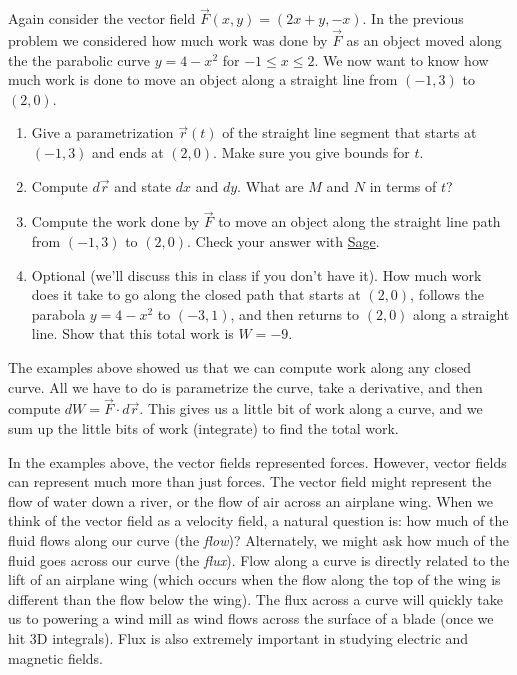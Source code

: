 \begin{problem}
 Again consider the vector field $\vec F(x,y) = (2x+y,-x)$. In the previous problem we considered how much work was done by $\vec F$ as an object moved along the the parabolic curve $y=4-x^2$ for $-1\leq x\leq 2$. We now want to know how much work is done to move an object along a straight line from $(-1,3)$ to $(2,0)$.    
\begin{enumerate}
 \item Give a parametrization $\vec r(t)$ of the straight line segment that starts at $(-1,3)$ and ends at $(2,0)$.  Make sure you give bounds for $t$. 
 \item Compute $d\vec r$ and state $dx$ and $dy$. What are $M$ and $N$ in terms of $t$?
 \item Compute the work done by $\vec F$ to move an object along the straight line path from $(-1,3)$ to $(2,0)$. Check your answer with \href{\sageworkurl}{Sage}. 
 \item Optional (we'll discuss this in class if you don't have it).  How much work does it take to go along the closed path that starts at $(2,0)$, follows the parabola $y=4-x^2$ to $(-3,1)$, and then returns to $(2,0)$ along a straight line. Show that this total work is $W=-9$.   
\end{enumerate}
\end{problem}


The examples above showed us that we can compute work along any closed curve.  All we have to do is parametrize the curve, take a derivative, and then compute $dW = \vec F \cdot d\vec r$. This gives us a little bit of work along a curve, and we sum up the little bits of work (integrate) to find the total work. 

In the examples above, the vector fields represented forces. However, vector fields can represent much more than just forces. The vector field might represent the flow of water down a river, or the flow of air across an airplane wing.  When we think of the vector field as a velocity field, a natural question is: how much of the fluid flows along our curve (the \emph{flow})? Alternately, we might ask how much of the fluid goes across our curve (the \emph{flux}).  Flow along a curve is directly related to the lift of an airplane wing (which occurs when the flow along the top of the wing is different than the flow below the wing).  The flux across a curve will quickly take us to powering a wind mill as wind flows across the surface of a blade (once we hit 3D integrals).  Flux is also extremely important in studying electric and magnetic fields.



